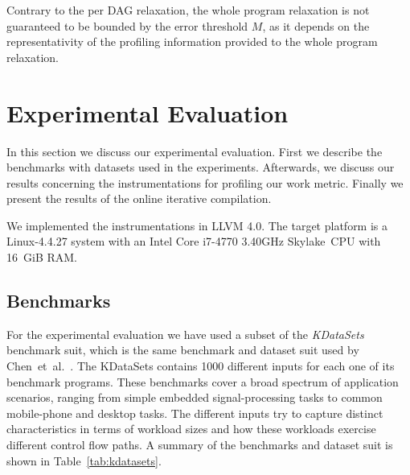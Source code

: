 \documentclass[sigplan,10pt]{acmart}
\theoremstyle{definition}
\newcommand{\etal}{et~al.}
\newcommand{\itercomp}{{iterative compilation}}
\begin{document}
Contrary to the per DAG relaxation, the whole program relaxation is not guaranteed to be bounded by the error threshold $M$,
as it depends on the representativity %
 of the profiling information provided to the whole program relaxation.


\section{Experimental Evaluation}

In this section we discuss our experimental evaluation.
First we describe the benchmarks with datasets used in the experiments.
Afterwards, we discuss our results concerning the instrumentations for profiling our work metric.
Finally we present the results of the online {\itercomp}.

We implemented the instrumentations in LLVM 4.0.
The target platform is a Linux-4.4.27 system with an Intel Core i7-4770 3.40GHz Skylake~CPU with 16~GiB RAM.

\subsection{Benchmarks}

For the experimental evaluation we have used a subset of the \textit{KDataSets} benchmark suit, which is the same benchmark and dataset suit used by Chen~\etal~\cite{chen10,chen12a}.
The KDataSets contains 1000 different inputs for each one of its benchmark programs.
These benchmarks cover a broad spectrum of application scenarios, ranging from simple embedded signal-processing tasks to common mobile-phone and desktop tasks.
The different inputs try to capture distinct characteristics in terms of workload sizes and how these workloads exercise different control flow paths.
A summary of the benchmarks and dataset suit is shown in Table~\ref{tab:kdatasets}.
\end{document}
